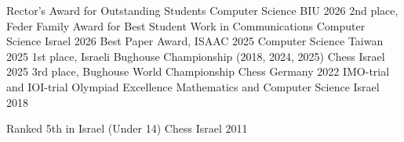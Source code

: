 
\begin{cvhonors}

  \cvhonor
    {Rector's Award for Outstanding Students} %
    {Computer Science} %
    {BIU} %
    {2026} %
  \cvhonor
    {2nd place, Feder Family Award for Best Student Work in Communications} %
    {Computer Science} %
    {Israel} %
    {2026} %
  \cvhonor
    {Best Paper Award, ISAAC 2025} %
    {Computer Science} %
    {Taiwan} %
    {2025} %
  \cvhonor
    {1st place, Israeli Bughouse Championship (2018, 2024, 2025)} %
    {Chess} %
    {Israel} %
    {2025} %
  \cvhonor
    {3rd place, Bughouse World Championship} %
    {Chess} %
    {Germany} %
    {2022} %
  \cvhonor
    {IMO-trial and IOI-trial Olympiad Excellence} %
    {Mathematics and Computer Science} %
    {Israel} %
    {2018} %

  \cvhonor
    {Ranked 5th in Israel (Under 14)} %
    {Chess} %
    {Israel} %
    {2011} %
\end{cvhonors}
